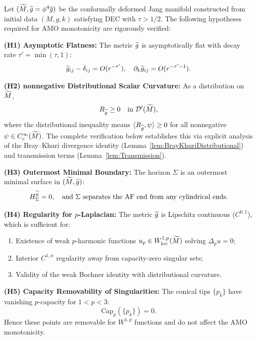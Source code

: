 \begin{theorem}\label{thm:AMOHypothesisVerification}
Let $(\widetilde{M}, \widetilde{g} = \phi^4 \overline{g})$ be the conformally deformed Jang manifold constructed from initial data $(M, g, k)$ satisfying DEC with $\tau > 1/2$. The following hypotheses required for AMO monotonicity are rigorously verified:

\textbf{(H1) Asymptotic Flatness:} The metric $\widetilde{g}$ is asymptotically flat with decay rate $\tau' = \min(\tau, 1)$:
\begin{equation}
    \widetilde{g}_{ij} - \delta_{ij} = O(r^{-\tau'}), \quad \partial_k \widetilde{g}_{ij} = O(r^{-\tau'-1}).
\end{equation}

\textbf{(H2) nonnegative Distributional Scalar Curvature:} As a distribution on $\widetilde{M}$,
\begin{equation}
    R_{\widetilde{g}} \ge 0 \quad \text{in } \mathcal{D}'(\widetilde{M}),
\end{equation}
where the distributional inequality means $\langle R_{\widetilde{g}}, \psi \rangle \ge 0$ for all nonnegative $\psi \in C^\infty_c(\widetilde{M})$. The complete verification below establishes this via explicit analysis of the Bray--Khuri divergence identity (Lemma~\ref{lem:BrayKhuriDistributional}) and transmission terms (Lemma~\ref{lem:Transmission}).

\textbf{(H3) Outermost Minimal Boundary:} The horizon $\Sigma$ is an outermost minimal surface in $(\widetilde{M}, \widetilde{g})$:
\begin{equation}
    H_\Sigma^{\widetilde{g}} = 0, \quad \text{and } \Sigma \text{ separates the AF end from any cylindrical ends.}
\end{equation}

\textbf{(H4) Regularity for $p$-Laplacian:} The metric $\widetilde{g}$ is Lipschitz continuous ($C^{0,1}$), which is sufficient for:
\begin{enumerate}
    \item[(a)] Existence of weak $p$-harmonic functions $u_p \in W^{1,p}_{\mathrm{loc}}(\widetilde{M})$ solving $\Delta_p u = 0$;
    \item[(b)] Interior $C^{1,\alpha}$ regularity away from capacity-zero singular sets;
    \item[(c)] Validity of the weak Bochner identity with distributional curvature.
\end{enumerate}

\textbf{(H5) Capacity Removability of Singularities:} The conical tips $\{p_k\}$ have vanishing $p$-capacity for $1 < p < 3$:
\begin{equation}
    \mathrm{Cap}_p(\{p_k\}) = 0.
\end{equation}
Hence these points are removable for $W^{1,p}$ functions and do not affect the AMO monotonicity.
\end{theorem}

